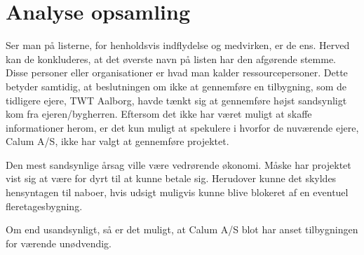 \section{Analyse opsamling}
Ser man på listerne, for henholdsvis indflydelse og medvirken, er de ens. Herved kan de konkluderes, at det øverste navn på listen har den afgørende stemme. Disse personer eller organisationer er hvad man kalder ressourcepersoner. Dette betyder samtidig, at beslutningen om ikke at gennemføre en tilbygning, som de tidligere ejere, TWT Aalborg, havde tænkt sig at gennemføre højst sandsynligt kom fra ejeren/bygherren. Eftersom det ikke har været muligt at skaffe informationer herom, er det kun muligt at spekulere i hvorfor de nuværende ejere, Calum A/S, ikke har valgt at gennemføre projektet. 

Den mest sandsynlige årsag ville være vedrørende økonomi. Måske har projektet vist sig at være for dyrt til at kunne betale sig. Herudover kunne det skyldes hensyntagen til naboer, hvis udsigt muligvis kunne blive blokeret af en eventuel fleretagesbygning. 

Om end usandsynligt, så er det muligt, at Calum A/S blot har anset tilbygningen for værende unødvendig.
